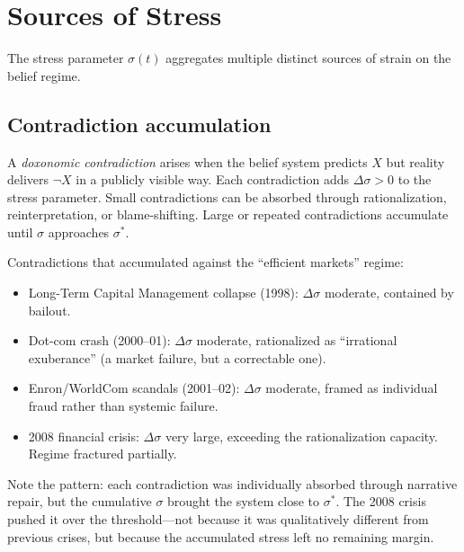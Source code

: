 \section{Sources of Stress}
\label{sec:ch30-stress}

The stress parameter $\sigma(t)$ aggregates multiple distinct sources of strain on the belief regime.

\subsection{Contradiction accumulation}

\begin{definition}
\label{def:contradiction}
A \emph{doxonomic contradiction} arises when the belief system predicts $X$ but reality delivers $\neg X$ in a publicly visible way.
Each contradiction adds $\Delta\sigma > 0$ to the stress parameter.
Small contradictions can be absorbed through rationalization, reinterpretation, or blame-shifting.
Large or repeated contradictions accumulate until $\sigma$ approaches $\sigma^*$.
\end{definition}

\begin{example}
\label{ex:contradictions}
Contradictions that accumulated against the ``efficient markets'' regime:
\begin{itemize}[nosep]
  \item Long-Term Capital Management collapse (1998): $\Delta\sigma$ moderate, contained by bailout.
  \item Dot-com crash (2000--01): $\Delta\sigma$ moderate, rationalized as ``irrational exuberance'' (a market failure, but a correctable one).
  \item Enron/WorldCom scandals (2001--02): $\Delta\sigma$ moderate, framed as individual fraud rather than systemic failure.
  \item 2008 financial crisis: $\Delta\sigma$ very large, exceeding the rationalization capacity. Regime fractured partially.
\end{itemize}
Note the pattern: each contradiction was individually absorbed through narrative repair, but the cumulative $\sigma$ brought the system close to $\sigma^*$.
The 2008 crisis pushed it over the threshold---not because it was qualitatively different from previous crises, but because the accumulated stress left no remaining margin.
\end{example}

